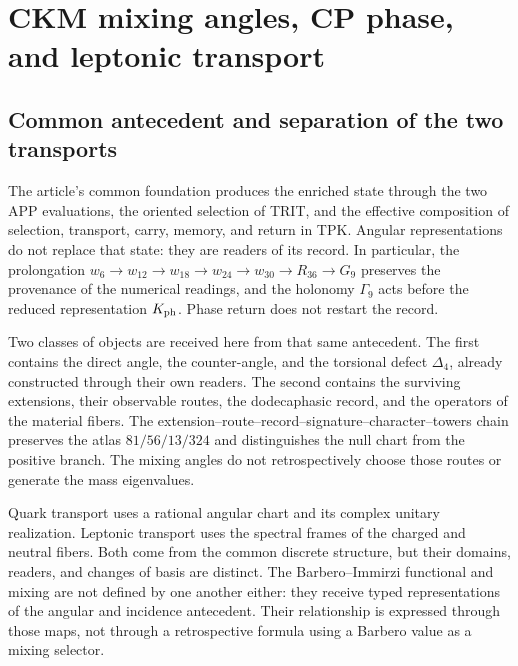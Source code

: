 
\section{CKM mixing angles, CP phase, and leptonic transport}
\label{sec:ii-propagacion-angular}

\subsection{Common antecedent and separation of the two transports}

The article's common foundation produces the enriched state through
the two APP evaluations, the oriented selection of TRIT, and the
effective composition of selection, transport, carry, memory, and return
in TPK. Angular representations do not replace that state: they are readers
of its record. In particular, the prolongation
\(w_6\to w_{12}\to w_{18}\to w_{24}\to w_{30}\to R_{36}\to G_9\)
preserves the provenance of the numerical readings, and the holonomy
\(\Gamma_9\) acts before the reduced representation \(K_{\rm ph}\).
Phase return does not restart the record.

Two classes of objects are received here from that same antecedent. The first
contains the direct angle, the counter-angle, and the torsional defect
\(\Delta_4\), already constructed through their own readers. The second contains
the surviving extensions, their observable routes, the dodecaphasic
record, and the operators of the material fibers. The
extension--route--record--signature--character--towers chain preserves the atlas
\(81/56/13/324\) and distinguishes the null chart from the positive branch.
The mixing angles do not retrospectively choose those routes or generate
the mass eigenvalues.

Quark transport uses a rational angular chart and its complex
unitary realization. Leptonic transport uses the spectral frames
of the charged and neutral fibers. Both come from the common discrete
structure, but their domains, readers, and changes of basis are distinct.
The Barbero--Immirzi functional and mixing are not defined by one
another either: they receive typed representations of the angular and incidence antecedent.
Their relationship is expressed through those maps, not through a
retrospective formula using a Barbero value as a mixing selector.

